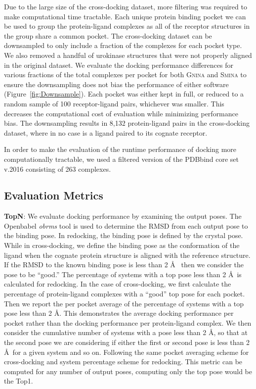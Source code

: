 \documentclass[journal=jcisd8,manuscript=article]{achemso}
\begin{document}
Due to the large size of the cross-docking dataset, more filtering was required to make computational time tractable. Each unique protein binding pocket we can be used to group the protein-ligand complexes as all of the receptor structures in the group share a common pocket. The cross-docking dataset can be downsampled to only include a fraction of the complexes for each pocket type. We also removed a handful of urokinase structures that were not properly aligned in the original dataset. We evaluate the docking performance differences for various fractions of the total complexes per pocket for both \textsc{Gnina} and \textsc{Smina} to ensure the downsampling does not bias the performance of either software (Figure~\ref{fig:Downsample}). Each pocket was either kept in full, or reduced to a random sample of 100 receptor-ligand pairs, whichever was smaller. This decreases the computational cost of evaluation while minimizing performance bias. The downsampling results in 8,132 protein-ligand pairs in the cross-docking dataset, where in no case is a ligand paired to its cognate receptor.

In order to make the evaluation of the runtime performance of docking more computationally tractable, we used a filtered version of the PDBbind core set v.2016\cite{su2018comparative} consisting of 263 complexes.

\subsection{Evaluation Metrics}

\textbf{TopN}: We evaluate docking performance by examining the output poses. The Openbabel \textit{obrms} tool\cite{babelopen,o2011open} is used to determine the RMSD from each output pose to the binding pose. In redocking, the binding pose is defined by the crystal pose. While in cross-docking, we define the binding pose as the conformation of the ligand when the cognate protein structure is aligned with the reference structure. If the RMSD to the known binding pose is less than 2 \AA~ then we consider the pose to be ``good.'' The percentage of systems with a top pose less than 2 \AA~is calculated for redocking. In the case of cross-docking, we first calculate the percentage of protein-ligand complexes with a ``good'' top pose for each pocket. Then we report the per pocket average of the percentage of systems with a top pose less than 2 \AA. This demonstrates the average docking performance per pocket rather than the docking performance per protein-ligand complex. We then consider the cumulative number of systems with a pose less than 2 \AA, so that at the second pose we are considering if either the first or second pose is less than 2 \AA~for a given system and so on. Following the same pocket averaging scheme for cross-docking and system percentage scheme for redocking. This metric can be computed for any number of output poses, computing only the top pose would be the Top1.
\end{document}
